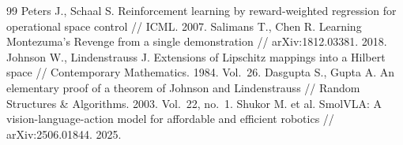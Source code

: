 \documentclass[11pt,a4paper]{article}
\theoremstyle{plain}
\theoremstyle{definition}
\theoremstyle{remark}
\begin{document}
\begin{thebibliography}{99}
 Peters J., Schaal S. Reinforcement learning by reward-weighted regression for operational space control // ICML. 2007.
 Salimans T., Chen R. Learning Montezuma's Revenge from a single demonstration // arXiv:1812.03381. 2018.
 Johnson W., Lindenstrauss J. Extensions of Lipschitz mappings into a Hilbert space // Contemporary Mathematics. 1984. Vol.~26.
 Dasgupta S., Gupta A. An elementary proof of a theorem of Johnson and Lindenstrauss // Random Structures \& Algorithms. 2003. Vol.~22, no.~1.
 Shukor M. et al. SmolVLA: A vision-language-action model for affordable and efficient robotics // arXiv:2506.01844. 2025.
\end{thebibliography}
\end{document}
